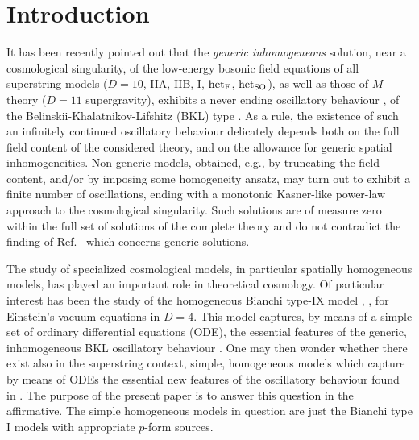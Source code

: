 \documentclass[a4paper,12pt]{article}
\begin{document}
\section{Introduction}
It has been recently pointed out that the {\it generic inhomogeneous} 
solution, near a cosmological singularity, of the low-energy 
bosonic field equations of all superstring models ($D=10$, IIA, 
IIB, I, ${\rm het}_{\rm E}$, ${\rm het}_{\rm SO}$), as well as those 
of $M$-theory ($D=11$ supergravity), exhibits a never ending 
oscillatory behaviour \cite{dh1}, of the 
Belinskii-Khalatnikov-Lifshitz (BKL) type \cite{BKL}. As a rule, the 
existence of such an infinitely continued oscillatory behaviour 
delicately depends both on the full field content of the considered 
theory, and on the allowance for generic spatial inhomogeneities. Non 
generic models, obtained, e.g., by truncating the field content, 
and/or by imposing some homogeneity ansatz, may turn out to exhibit a 
finite number of oscillations, ending with a monotonic Kasner-like 
power-law approach to the cosmological singularity. Such solutions 
are of measure zero within the full set of solutions of the complete 
theory and do not contradict the finding of Ref.~\cite{dh1} which 
concerns generic solutions. 

The study of 
specialized cosmological models, in particular spatially homogeneous 
models, has played an important role in theoretical cosmology. Of 
particular interest has been the study of the homogeneous Bianchi 
type-IX model \cite{bkl69}, \cite{misner69}, for Einstein's vacuum 
equations in $D=4$. This model captures, by means of a simple set of 
ordinary differential equations (ODE), the essential features of the 
generic, inhomogeneous BKL oscillatory behaviour \cite{BKL}.
One may then wonder whether there exist also in the superstring context,
simple, homogeneous models which capture by means of ODEs the
essential new features of the oscillatory behaviour found in
\cite{dh1}.
The purpose of the present paper is to answer this question
in the affirmative.
The simple homogeneous
models in question are just the Bianchi type I models with
appropriate $p$-form sources.  
\end{document}
